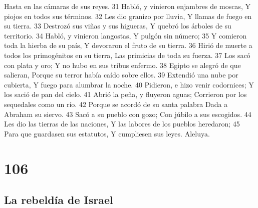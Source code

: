 Hasta en las cámaras de sus reyes.
31 Habló, y vinieron enjambres de moscas,
Y piojos en todos sus términos.
32 Les dio granizo por lluvia,
Y llamas de fuego en su tierra.
33 Destrozó sus viñas y sus higueras,
Y quebró los árboles de su territorio.
34 Habló, y vinieron langostas,
Y pulgón sin número;
35 Y comieron toda la hierba de su país,
Y devoraron el fruto de su tierra.
36 Hirió de muerte a todos los primogénitos en su tierra,
Las primicias de toda su fuerza.
37 Los sacó con plata y oro;
Y no hubo en sus tribus enfermo.
38 Egipto se alegró de que salieran,
Porque su terror había caído sobre ellos.
39 Extendió una nube por cubierta,
Y fuego para alumbrar la noche.
40 Pidieron, e hizo venir codornices;
Y los sació de pan del cielo.
41 Abrió la peña, y fluyeron aguas;
Corrieron por los sequedales como un río.
42 Porque se acordó de su santa palabra
Dada a Abraham su siervo.
43 Sacó a su pueblo con gozo;
Con júbilo a sus escogidos.
44 Les dio las tierras de las naciones,
Y las labores de los pueblos heredaron;
45 Para que guardasen sus estatutos,
Y cumpliesen sus leyes.
Aleluya.

\chapter{106}

\section*{La rebeldía de Israel}

